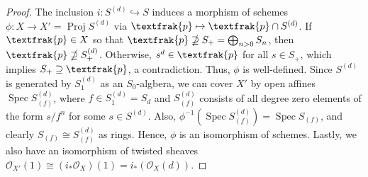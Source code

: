 \documentclass{article}
\newcommand{\goth}[1]{\textfrak{#1}}
\newcommand{\fO}{\mathcal{O}}
\DeclareMathOperator{\proj}{Proj}
\DeclareMathOperator{\spec}{Spec}
\begin{document}
\begin{enumerate} [label=\textbf{\arabic*.}, leftmargin=0em]
\begin{proof}
    The inclusion $i : S^{(d)} \hookrightarrow S$ induces a morphism of schemes $\phi : X \to X' = \proj{S^{(d)}}$ via $\goth{p} \mapsto \goth{p} \cap S^{(d)}$. If $\goth{p} \in X$ so that $\goth{p} \nsupseteq S_+ = \bigoplus_{n > 0} S_n$, then $\goth{p} \nsupseteq S_+^{(d)}$. Otherwise, $s^d \in \goth{p}$ for all $s \in S_+$, which implies $S_+ \supseteq \goth{p}$, a contradiction. Thus, $\phi$ is well-defined. Since $S^{(d)}$ is generated by $S^{(d)}_1$ as an $S_0$-algbera, we can cover $X'$ by open affines $\spec{S^{(d)}_{(f)}}$, where $f \in S^{(d)}_1 = S_d$ and $S^{(d)}_{(f)}$ consists of all degree zero elements of the form $s / f^n$ for some $s \in S^{(d)}$. Also, $\phi^{-1}(\spec{S^{(d)}_{(f)}}) = \spec{S_{(f)}}$, and clearly $S_{(f)} \cong S_{(f)}^{(d)}$ as rings. Hence, $\phi$ is an isomorphism of schemes. Lastly, we also have an isomorphism of twisted sheaves $\fO_{X'}(1) \cong (i_* \fO_{X})(1) = i_*(\fO_X(d))$.
\end{proof}


\end{enumerate}
\end{document}
